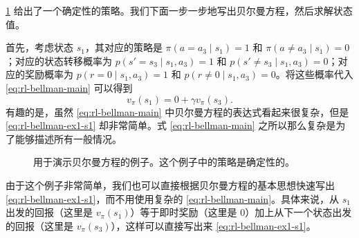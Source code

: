 \begin{example}[确定性策略]
\label{ex:rl-bellman-deterministic}
\cref{fig:rl-bellman-ex-deterministic} 给出了一个确定性的策略。我们下面一步一步地写出贝尔曼方程，然后求解状态值。

首先，考虑状态 $s_1$，其对应的策略是 $\pi(a = a_3 \mid s_1) = 1$ 和 $\pi(a \neq a_3 \mid s_1) = 0$；对应的状态转移概率为 $p(s' = s_3 \mid s_1, a_3) = 1$ 和 $p(s' \neq s_3 \mid s_1, a_3) = 0$；对应的奖励概率为 $p(r = 0 \mid s_1, a_3) = 1$ 和 $p(r \neq 0 \mid s_1, a_3) = 0$。将这些概率代入 \cref{eq:rl-bellman-main} 可以得到
\begin{equation}
v_\pi(s_1) = 0 + \gamma v_\pi(s_3).
\label{eq:rl-bellman-ex1-s1}
\end{equation}
有趣的是，虽然 \cref{eq:rl-bellman-main} 中贝尔曼方程的表达式看起来很复杂，但是 \cref{eq:rl-bellman-ex1-s1} 却非常简单。式 \cref{eq:rl-bellman-main} 之所以那么复杂是为了能够描述所有一般情况。

\begin{figure}[H]
\centering
{}
\caption{用于演示贝尔曼方程的例子。这个例子中的策略是确定性的。}
\label{fig:rl-bellman-ex-deterministic}
\end{figure}

由于这个例子非常简单，我们也可以直接根据贝尔曼方程的基本思想快速写出 \cref{eq:rl-bellman-ex1-s1}，而不用使用复杂的 \cref{eq:rl-bellman-main}。具体来说，从 $s_1$ 出发的回报（这里是 $v_\pi(s_1)$）等于即时奖励（这里是 $0$）加上从下一个状态出发的回报（这里是 $v_\pi(s_3)$），这样可以直接写出来 \cref{eq:rl-bellman-ex1-s1}。


\end{example}
